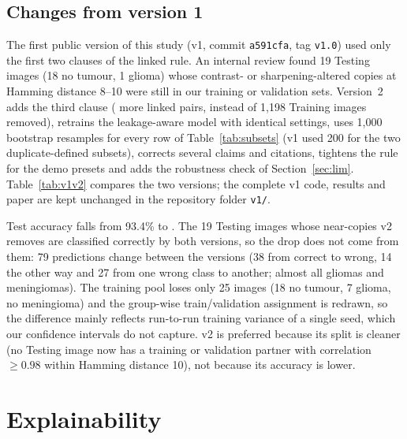 \documentclass[11pt,a4paper]{article}
\begin{document}
\subsection{Changes from version 1}\label{sec:v1v2}
The first public version of this study (v1, commit \texttt{a591cfa}, tag \texttt{v1.0}) used only the first two clauses of the linked rule. An internal review found 19 Testing images (18 no tumour, 1 glioma) whose contrast- or sharpening-altered copies at Hamming distance 8--10 were still in our training or validation sets. Version~2 adds the third clause (\DExtraPairsVTwoRule{} more linked pairs, \DTrainImgRemovedCrossSplit{} instead of 1{,}198 Training images removed), retrains the leakage-aware model with identical settings, uses 1{,}000 bootstrap resamples for every row of Table~\ref{tab:subsets} (v1 used 200 for the two duplicate-defined subsets), corrects several claims and citations, tightens the rule for the demo presets and adds the robustness check of Section~\ref{sec:lim}. Table~\ref{tab:v1v2} compares the two versions; the complete v1 code, results and paper are kept unchanged in the repository folder \texttt{v1/}.

Test accuracy falls from 93.4\% to \AccCFull{}. The 19 Testing images whose near-copies v2 removes are classified correctly by both versions, so the drop does not come from them: 79 predictions change between the versions (38 from correct to wrong, 14 the other way and 27 from one wrong class to another; almost all gliomas and meningiomas). The training pool loses only 25 images (18 no tumour, 7 glioma, no meningioma) and the group-wise train/validation assignment is redrawn, so the difference mainly reflects run-to-run training variance of a single seed, which our confidence intervals do not capture. v2 is preferred because its split is cleaner (no Testing image now has a training or validation partner with correlation $\ge 0.98$ within Hamming distance 10), not because its accuracy is lower.

\begin{table}[t]
\centering\small
\caption{Leakage-aware model, v1 (commit \texttt{a591cfa}) versus v2, on the same 1{,}600 Testing images. All values are read from the saved metric files of each version.}
\label{tab:v1v2}
\resizebox{\linewidth}{!}{}
\end{table}

\section{Explainability}
\end{document}
